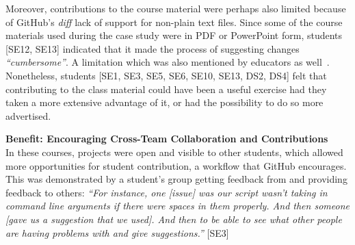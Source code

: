 Moreover, contributions to the course material were perhaps also limited because of GitHub's \emph{diff} lack of support for non-plain text files. Since some of the course materials used during the case study were in PDF or PowerPoint form, students [SE12, SE13] indicated that it made the process of suggesting changes \textit{``cumbersome''}. A limitation which was also mentioned by educators as well~\cite{zagalsky2015emergence}. Nonetheless, students [SE1, SE3, SE5, SE6, SE10, SE13, DS2, DS4] felt that contributing to the class material could have been a useful exercise had they taken a more extensive advantage of it, or had the possibility to do so more advertised.




\textbf{Benefit: Encouraging Cross-Team Collaboration and Contributions} \\
In these courses, projects were open and visible to other students, which allowed more opportunities for student contribution, a workflow that GitHub encourages. This was demonstrated by a student's group getting feedback from and providing feedback to others: \textit{``For instance, one [issue] was our script wasn't taking in command line arguments if there were spaces in them properly. And then someone [gave us a suggestion that we used]. And then to be able to see what other people are having problems with and give suggestions.''} [SE3]


